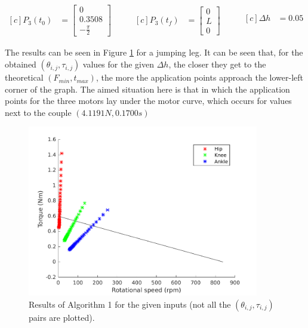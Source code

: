\begin{equation*}
\label{eq:input_a1}
\begin{aligned}[c]
P_{3}(t_{0}) &= \left[\!
				    \begin{array}{c}
				      0 \\
				      0.3508 \\
				      -\frac{\pi}{2}
				    \end{array}
				  \!\right]
\end{aligned}
\qquad
\begin{aligned}[c]
P_{3}(t_{f}) &= \left[\!
				    \begin{array}{c}
				      0 \\
				      L \\
				      0
				    \end{array}
				  \!\right]
\end{aligned}
\qquad
\begin{aligned}[c]
\Delta h &= 0.05 \\
\end{aligned}
\end{equation*}

The results can be seen in Figure \ref{fig:alg1_results} for a jumping leg.
It can be seen that, for the obtained $(\theta_{i,j}, \tau_{i,j})$ values for the given $\Delta h$, the closer they get to the theoretical $(F_{min}, t_{max})$, the more the application points approach the lower-left corner of the graph.
The aimed situation here is that in which the application points for the three motors lay under the motor curve, which occurs for values next to the couple $(4.1191N, 0.1700s)$

\begin{figure}[htb]
	\centering
	\includegraphics[width=0.9\textwidth]{figures/algorithm1.pdf}
	\caption{Results of Algorithm 1 for the given inputs (not all the $(\theta_{i,j}, \tau_{i,j})$ pairs are plotted).}
	\label{fig:alg1_results}
\end{figure}


